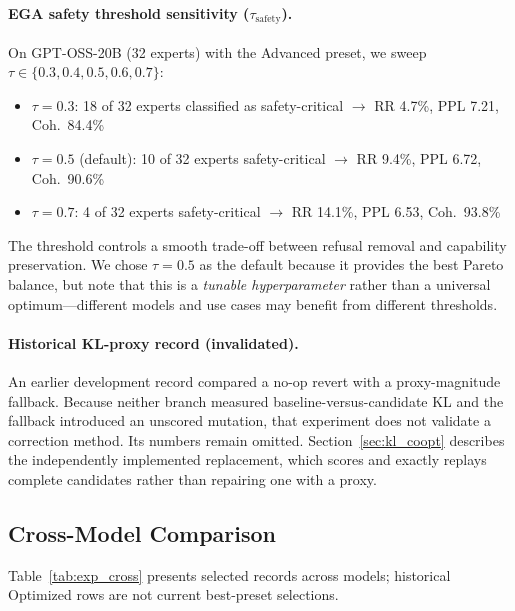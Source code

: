 \documentclass[11pt]{article}
\begin{document}
\paragraph{EGA safety threshold sensitivity ($\tau_{\text{safety}}$).}
On GPT-OSS-20B (32 experts) with the Advanced preset, we sweep $\tau \in \{0.3, 0.4, 0.5, 0.6, 0.7\}$:
\begin{itemize}[leftmargin=*]
    \item $\tau = 0.3$: 18 of 32 experts classified as safety-critical $\to$ RR 4.7\%, PPL 7.21, Coh.\ 84.4\%
    \item $\tau = 0.5$ (default): 10 of 32 experts safety-critical $\to$ RR 9.4\%, PPL 6.72, Coh.\ 90.6\%
    \item $\tau = 0.7$: 4 of 32 experts safety-critical $\to$ RR 14.1\%, PPL 6.53, Coh.\ 93.8\%
\end{itemize}
The threshold controls a smooth trade-off between refusal removal and capability preservation. We chose $\tau = 0.5$ as the default because it provides the best Pareto balance, but note that this is a \emph{tunable hyperparameter} rather than a universal optimum---different models and use cases may benefit from different thresholds.

\paragraph{Historical KL-proxy record (invalidated).}
An earlier development record compared a no-op revert with a proxy-magnitude fallback. Because neither branch measured baseline-versus-candidate KL and the fallback introduced an unscored mutation, that experiment does not validate a correction method. Its numbers remain omitted. Section~\ref{sec:kl_coopt} describes the independently implemented replacement, which scores and exactly replays complete candidates rather than repairing one with a proxy.

\subsection{Cross-Model Comparison}
\label{sec:exp_cross}

Table~\ref{tab:exp_cross} presents selected records across models; historical Optimized rows are not current best-preset selections.
\end{document}
